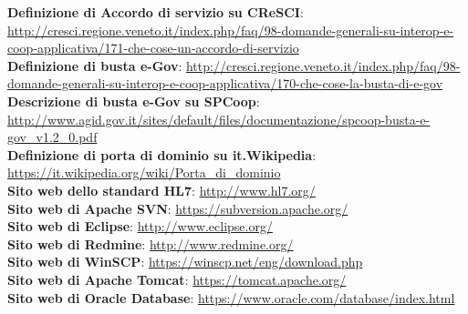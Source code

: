 \documentclass[a4paper]{article}
\begin{document}
\noindent
\textbf{Definizione di Accordo di servizio su CReSCI}: \url{http://cresci.regione.veneto.it/index.php/faq/98-domande-generali-su-interop-e-coop-applicativa/171-che-cose-un-accordo-di-servizio}
\\

\noindent
\textbf{Definizione di busta e-Gov}: \url{http://cresci.regione.veneto.it/index.php/faq/98-domande-generali-su-interop-e-coop-applicativa/170-che-cose-la-busta-di-e-gov}
\\

\noindent
\textbf{Descrizione di busta e-Gov su SPCoop}: \url{http://www.agid.gov.it/sites/default/files/documentazione/spcoop-busta-e-gov_v1.2_0.pdf}
\\

\noindent
\textbf{Definizione di porta di dominio su it.Wikipedia}: \url{https://it.wikipedia.org/wiki/Porta_di_dominio}
\\

\noindent
\textbf{Sito web dello standard HL7}: \url{http://www.hl7.org/}
\\

\noindent
\textbf{Sito web di Apache SVN}: \url{https://subversion.apache.org/}
\\

\noindent
\textbf{Sito web di Eclipse}: \url{http://www.eclipse.org/}
\\

\noindent
\textbf{Sito web di Redmine}: \url{http://www.redmine.org/}
\\

\noindent
\textbf{Sito web di WinSCP}: \url{https://winscp.net/eng/download.php}
\\

\noindent
\textbf{Sito web di Apache Tomcat}: \url{https://tomcat.apache.org/}
\\

\noindent
\textbf{Sito web di Oracle Database}: \url{https://www.oracle.com/database/index.html}
\\
\end{document}
